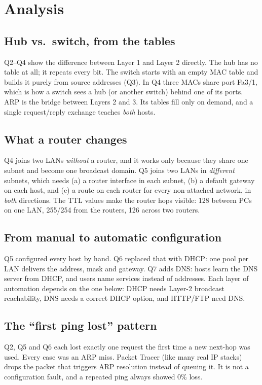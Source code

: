 \documentclass[11pt]{article}
\begin{document}
\section{Analysis}

\subsection{Hub vs.\ switch, from the tables}
Q2--Q4 show the difference between Layer 1 and Layer 2 directly. The hub has no table at
all; it repeats every bit. The switch starts with an empty MAC table and builds it purely
from source addresses (Q3). In Q4 three MACs share port Fa3/1, which is how a switch sees
a hub (or another switch) behind one of its ports. ARP is the bridge between Layers 2 and 3.
Its tables fill only on demand, and a single request/reply exchange teaches \emph{both}
hosts.

\subsection{What a router changes}
Q4 joins two LANs \emph{without} a router, and it works only because they share one subnet
and become one broadcast domain. Q5 joins two LANs in \emph{different} subnets, which needs
(a) a router interface in each subnet, (b) a default gateway on each host, and (c) a route
on each router for every non-attached network, in \emph{both} directions. The TTL values make
the router hops visible: 128 between PCs on one LAN, 255/254 from the routers, 126 across
two routers.

\subsection{From manual to automatic configuration}
Q5 configured every host by hand. Q6 replaced that with DHCP: one pool per LAN delivers the
address, mask and gateway. Q7 adds DNS: hosts learn the DNS server from DHCP, and users name
services instead of addresses. Each layer of automation depends on the one below: DHCP
needs Layer-2 broadcast reachability, DNS needs a correct DHCP option, and HTTP/FTP need
DNS.

\subsection{The ``first ping lost'' pattern}
Q2, Q5 and Q6 each lost exactly one request the first time a new next-hop was used. Every
case was an ARP miss. Packet Tracer (like many real IP stacks) drops the packet that
triggers ARP resolution instead of queuing it. It is not a configuration fault, and a
repeated ping always showed 0\% loss.
\end{document}
